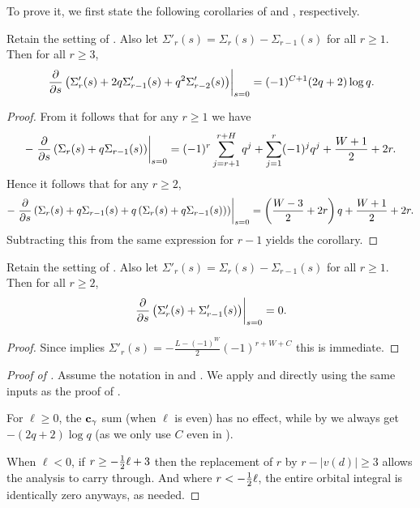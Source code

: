 To prove it, we first state the following corollaries
of  and , respectively.
\begin{corollary}
  \label{cor:derivative_nn}
  Retain the setting of .
  Also let $\Sigma'_r(s) = \Sigma_r(s) - \Sigma_{r-1}(s)$ for all $r \ge 1$.
  Then for all $r \ge 3$,
  \[
    \left. \pdv{}{s}
      \left( \Sigma'_r(s) + 2q \Sigma'_{r-1}(s) + q^2 \Sigma'_{r-2}(s) \right)
      \right\rvert_{s=0}
      = (-1)^{C+1} (2q+2) \log q.
  \]
\end{corollary}
\begin{proof}
  From  it follows that for any $r \ge 1$ we have
  \[ -\left. \pdv{}{s} \left( \Sigma_r(s) + q \Sigma_{r-1}(s) \right) \right\rvert_{s=0}
    = (-1)^r \sum_{j=r+1}^{r+H} q^j + \sum_{j=1}^r (-1)^j q^j + \frac{W+1}{2} + 2r. \]
  Hence it follows that for any $r \ge 2$,
  \[ -\left. \pdv{}{s} \left(
      \Sigma_r(s) + q \Sigma_{r-1}(s)
      + q \left( \Sigma_r(s) + q \Sigma_{r-1}(s) \right) \right) \right\rvert_{s=0}
    = \left( \frac{W-3}{2}+2r \right) q + \frac{W+1}{2}+2r.
  \]
  Subtracting this from the same expression for $r-1$ yields the corollary.
\end{proof}

\begin{corollary}
  \label{cor:derivative_cc}
  Retain the setting of .
  Also let $\Sigma'_r(s) = \Sigma_r(s) - \Sigma_{r-1}(s)$ for all $r \ge 1$.
  Then for all $r \ge 2$,
  \[ \left. \pdv{}{s}
      \left( \Sigma'_r(s) + \Sigma'_{r-1}(s) \right)
      \right\rvert_{s=0} = 0. \]
\end{corollary}
\begin{proof}
  Since  implies $\Sigma'_r(s) = - \frac{L - (-1)^W}{2} (-1)^{r+W+C}$
  this is immediate.
\end{proof}

\begin{proof}
  [Proof of ]
  Assume the notation in  and .
  We apply  and  directly
  using the same inputs as the proof of .

  For $\ell \ge 0$, the $\mathbf c_\gamma$ sum (when $\ell$ is even) has no effect,
  while by  we always get $-(2q+2) \log q$
  (as we only use $C$ even in ).

  When $\ell < 0$, if $r \ge -\frac{1}{2} \ell + 3$ then
  the replacement of $r$ by $r-|v(d)| \ge 3$ allows the analysis to carry through.
  And where $r < -\frac{1}{2}\ell$, the entire orbital integral is identically zero anyways, as needed.
\end{proof}

